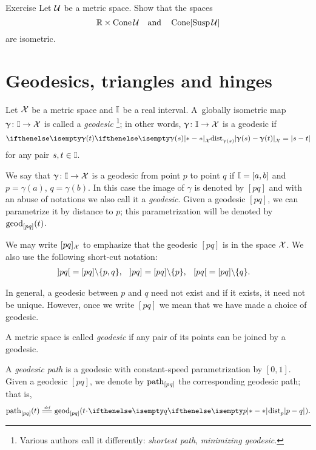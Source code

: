 \begin{thm}{Exercise}\label{ex:product-cone}
Let $\mathcal{U}$ be a metric space.
Show that the spaces 
\[\RR\times \Cone\spc{U}\quad\text{and}\quad\Cone[\Susp\spc{U}]\]
are  isometric.
\end{thm}




\section{Geodesics, triangles and hinges}
\label{sec:geods}

Let $\mathcal{X}$ be a metric space 
and $\II$\index{$\II$} be a real interval. 
A~globally isometric map $\gamma\:\II\to \spc{X}$ is called a \emph{geodesic}%
\footnote{Various authors call it differently: {}\emph{shortest path}, {}\emph{minimizing geodesic}.}; 
in other words, $\gamma\:\II\to \spc{X}$ is a geodesic if 
\[\dist{\gamma(s)}{\gamma(t)}{\spc{X}}=|s-t|\]
for any pair $s,t\in \II$.

We say that  $\gamma\:\II\to \spc{X}$ is a geodesic from point $p$ to point $q$ if 
$\mathbb{I}=[a,b]$ and $p=\gamma(a)$, $q=\gamma(b)$.
In this case the image of $\gamma$ is denoted by $[p q]$\index{$[{*}{*}]$} and with an abuse of notations  we also call it a \emph{geodesic}.
Given a geodesic $[pq]$, we can parametrize it by distance to $p$;
this parametrization will be denoted by $\mathrm{geod}_{[p q]}(t)$.


We may write $[p q]_{\mathcal{X}}$ 
to emphasize that the geodesic $[p q]$ is in the space  ${\mathcal{X}}$.
We also use the following short-cut notation:
\begin{align*}
\hskip-0.1em\left] p q \right[&=[pq]\backslash\{p,q\},
&
\hskip-0.1em\left] p q \right]&=[pq]\backslash\{p\},
&
\hskip-0.1em\left[ p q \right[&=[pq]\backslash\{q\}.
\end{align*}



In general, a geodesic between $p$ and $q$ need not exist and if it exists, it need not  be unique.  
However,  once we write $[p q]$ we mean that we have  made a choice of  geodesic.

A metric space is called \emph{geodesic} if any pair of its points can be joined by a geodesic. 


A \emph{geodesic path} is a geodesic with constant-speed parametrization by $[0,1]$.
Given a geodesic $[p q]$,
we denote by $\mathrm{path}_{[pq]}$ the corresponding geodesic path;
that is,
$$\geodpath_{[pq]}(t)\z\df\geod_{[pq]}(t\cdot\dist[{{}}]{p}{q}{}).$$

